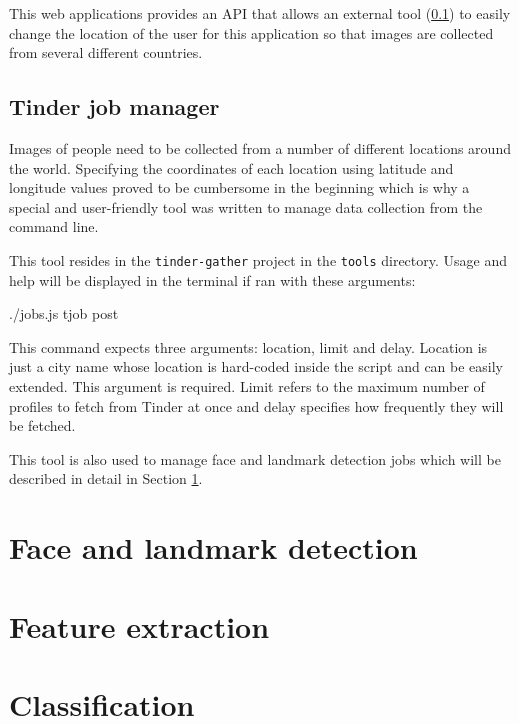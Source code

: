 This web applications provides an API that allows an external tool 
(\ref{spec:data:jobs}) to easily change the location of the user for this 
application so that images are collected from several different 
countries.

\subsection{Tinder job manager}
\label{spec:data:jobs}
Images of people need to be collected from a number of different locations 
around the world. Specifying the coordinates of each location using latitude 
and longitude values proved to be cumbersome in the beginning which is why a 
special and user-friendly tool was written to manage data collection from the 
command line.

This tool resides in the \texttt{tinder-gather} project in the \texttt{tools} 
directory. Usage and help will be displayed in the terminal if ran with these 
arguments:
\begin{logs}
./jobs.js tjob post
\end{logs}

This command expects three arguments: location, limit and delay. Location is 
just a city name whose location is hard-coded inside the script and can be 
easily extended. This argument is required. Limit refers to the maximum number 
of profiles to fetch from Tinder at once and delay specifies how frequently 
they will be fetched.

This tool is also used to manage face and landmark detection jobs which will 
be described in detail in Section \ref{spec:fd}. 

\section{Face and landmark detection}
\label{spec:fd}

\section{Feature extraction}

\section{Classification}

